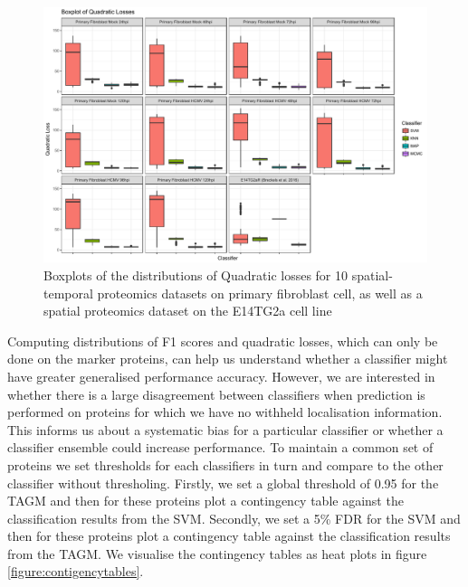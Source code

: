 \documentclass[12pt,english]{article}
\begin{document}
\begin{figure}[ht]
  \centering
\includegraphics[width=\textwidth]{Quadlosscompare2.pdf}
  \caption{Boxplots of the distributions of Quadratic losses
    for 10 spatial-temporal proteomics datasets on primary fibroblast cell,
    as well as a spatial proteomics dataset on the E14TG2a cell line}
  \label{figure::quadloss2}
\end{figure}


\clearpage

Computing distributions of F1 scores and quadratic losses, which can only be done
on the marker proteins, can help us
understand whether a classifier might have greater generalised
performance accuracy. However, we are interested in whether there is a
large disagreement between classifiers when prediction is performed on
proteins for which we have no withheld localisation information. This
informs us about a systematic bias for a particular classifier or
whether a classifier ensemble could increase performance. To maintain
a common set of proteins we set thresholds for each classifiers in turn
and compare to the other classifier without thresholing. Firstly, we
set a global threshold of 0.95 for the TAGM and then for these
proteins plot a contingency table against the classification results
from the SVM. Secondly, we set a 5\% FDR for the SVM and then for
these proteins plot a contingency table against the classification
results from the TAGM. We visualise the contingency tables as heat
plots in figure \ref{figure:contigencytables}.
\end{document}
